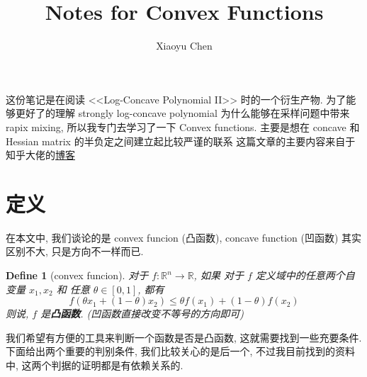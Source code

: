 \documentclass{article}
\title{Notes for Convex Functions}
\author{Xiaoyu Chen}
\date{}
\newtheorem{define}{Define}
\begin{document}
\maketitle
这份笔记是在阅读 <<Log-Concave Polynomial II>> 时的一个衍生产物.
为了能够更好了的理解 strongly log-concave polynomial 为什么能够在采样问题中带来 rapix mixing, 所以我专门去学习了一下 Convex functions.
主要是想在 concave 和 Hessian matrix 的半负定之间建立起比较严谨的联系
这篇文章的主要内容来自于知乎大佬的\href{http://yangzhou301.xyli.me/2016/03/14/826442654/}{博客}

\section{定义}
在本文中,  我们谈论的是 convex funcion (凸函数), concave function (凹函数) 其实区别不大, 只是方向不一样而已.
\begin{define}[convex funcion]
  对于 $f: \mathbb{R}^n \to \mathbb{R}$, 如果 对于 $f$ 定义域中的任意两个自变量 $x_1, x_2$ 和 任意 $\theta \in [0, 1]$, 都有
  \[f(\theta x_1 + (1 - \theta)x_2) \leq \theta f(x_1) + (1 - \theta)f(x_2)\]
  则说, $f$ 是\textbf{凸函数}. (凹函数直接改变不等号的方向即可)
\end{define}

我们希望有方便的工具来判断一个函数是否是凸函数, 这就需要找到一些充要条件.
下面给出两个重要的判别条件, 我们比较关心的是后一个, 不过我目前找到的资料中, 这两个判据的证明都是有依赖关系的.
\end{document}
